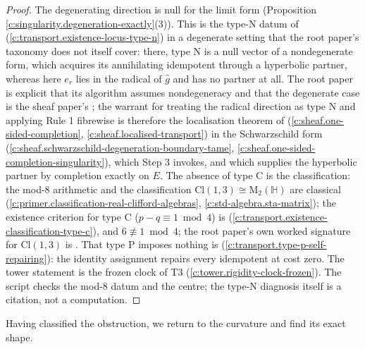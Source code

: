 \documentclass[11pt]{article}
\theoremstyle{definition}
\theoremstyle{plain}
\providecommand{\Cl}{}\renewcommand{\Cl}{\mathrm{Cl}}
\providecommand{\HH}{}\renewcommand{\HH}{\mathbb{H}}
\providecommand{\Mat}{}\renewcommand{\Mat}{\mathrm{M}}
\providecommand{\er}{}\renewcommand{\er}{e_r}
\begin{document}
\begin{proof}
The degenerating direction is null for the limit form (Proposition \ref{c:singularity.degeneration-exactly}(3)). This is the type-N datum of \cite[Def.~3.1, Prop.~3.3]{ButlerT1} (\ref{c:transport.existence-locus-type-n}) in a degenerate setting that the root paper's taxonomy does not itself cover: there, type N is a null vector of a nondegenerate form, which acquires its annihilating idempotent through a hyperbolic partner, whereas here $\er$ lies in the radical of $\hat g$ and has no partner at all. The root paper is explicit that its algorithm assumes nondegeneracy and that the degenerate case is the sheaf paper's \cite[Rem.~4.15, Rem.~8.4]{ButlerT1}; the warrant for treating the radical direction as type N and applying Rule 1 fibrewise is therefore the localisation theorem of \cite[Thm.~4.4, Cor.~4.5]{ButlerT4} (\ref{c:sheaf.one-sided-completion}, \ref{c:sheaf.localised-transport}) in the Schwarzschild form \cite[Thms 8.7, 8.12]{ButlerT4} (\ref{c:sheaf.schwarzschild-degeneration-boundary-tame}, \ref{c:sheaf.one-sided-completion-singularity}), which Step 3 invokes, and which supplies the hyperbolic partner by completion exactly on $E$. The absence of type C is the classification: the mod-8 arithmetic and the classification $\Cl(1,3) \cong \Mat_2(\HH)$ are classical \cite{Porteous1995} (\ref{c:primer.classification-real-clifford-algebras}, \ref{c:std-algebra.sta-matrix}); the existence criterion for type C ($p - q \equiv 1 \bmod 4$) is \cite[Thm.~3.6]{ButlerT1} (\ref{c:transport.existence-classification-type-c}), and $6 \not\equiv 1 \bmod 4$; the root paper's own worked signature for $\Cl(1,3)$ is \cite[Ex.~3.12]{ButlerT1}. That type P imposes nothing is \cite[Prop.~6.1]{ButlerT1} (\ref{c:transport.type-p-self-repairing}): the identity assignment repairs every idempotent at cost zero. The tower statement is the frozen clock of T3 \cite{ButlerT3} (\ref{c:tower.rigidity-clock-frozen}). The script checks the mod-8 datum and the centre; the type-N diagnosis itself is a citation, not a computation.

\end{proof}

Having classified the obstruction, we return to the curvature and find its exact shape.
\end{document}
